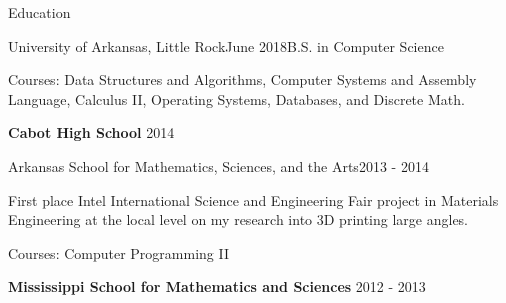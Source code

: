 \documentclass{resume} %
\begin{document}

\begin{rSection}{Education}

\begin{rSubsection}{University of Arkansas, Little Rock}{June 2018}{B.S. in Computer Science}

	\item Courses: Data Structures and Algorithms, Computer Systems and Assembly Language, Calculus II, Operating Systems, Databases, and Discrete Math.
\end{rSubsection}

{\bf Cabot High School} \hfill {2014} \hspace{0.0em}

\begin{rSubsection}{Arkansas School for Mathematics, Sciences, and the Arts}{2013 - 2014}{}

	\item First place Intel International Science and Engineering Fair project in Materials Engineering at the local level on my research into 3D printing large angles.
	\item Courses: Computer Programming II
\end{rSubsection}


{\bf Mississippi School for Mathematics and Sciences} \hfill {2012 - 2013} \hspace{0.0em}

\end{rSection}


\clearpage
\end{document}
